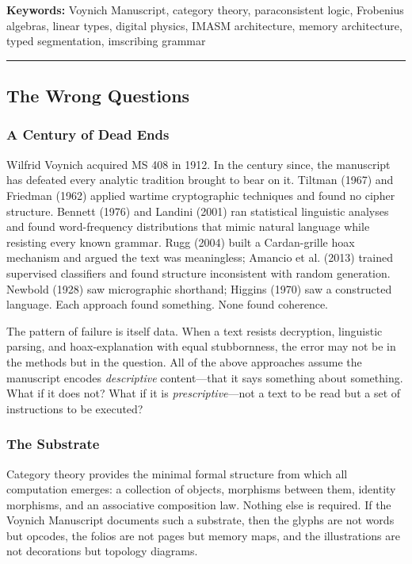 \documentclass[12pt,a4paper]{article}
\begin{document}
\textbf{Keywords:} Voynich Manuscript, category theory, paraconsistent logic, Frobenius algebras, linear types, digital physics, IMASM architecture, memory architecture, typed segmentation, imscribing grammar

\begin{center}
\rule{0.5\textwidth}{0.4pt}
\end{center}

\subsection{The Wrong Questions}

\subsubsection{A Century of Dead Ends}

Wilfrid Voynich acquired MS 408 in 1912. In the century since, the manuscript has defeated every analytic tradition brought to bear on it. Tiltman (1967) and Friedman (1962) applied wartime cryptographic techniques and found no cipher structure. Bennett (1976) and Landini (2001) ran statistical linguistic analyses and found word-frequency distributions that mimic natural language while resisting every known grammar. Rugg (2004) built a Cardan-grille hoax mechanism and argued the text was meaningless; Amancio et al. (2013) trained supervised classifiers and found structure inconsistent with random generation. Newbold (1928) saw micrographic shorthand; Higgins (1970) saw a constructed language. Each approach found something. None found coherence.

The pattern of failure is itself data. When a text resists decryption, linguistic parsing, and hoax-explanation with equal stubbornness, the error may not be in the methods but in the question. All of the above approaches assume the manuscript encodes \emph{descriptive} content---that it says something about something. What if it does not? What if it is \emph{prescriptive}---not a text to be read but a set of instructions to be executed?

\subsubsection{The Substrate}

Category theory provides the minimal formal structure from which all computation emerges: a collection of objects, morphisms between them, identity morphisms, and an associative composition law. Nothing else is required. If the Voynich Manuscript documents such a substrate, then the glyphs are not words but opcodes, the folios are not pages but memory maps, and the illustrations are not decorations but topology diagrams.
\end{document}
